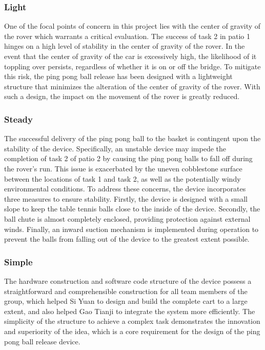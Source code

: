 \documentclass[12pt, a4paper, oneside]{report}
\begin{document}
\subsubsection{Light}
One of the focal points of concern in this project lies with the center of gravity of the rover which warrants a critical evaluation. The success of task 2 in patio 1 hinges on a high level of stability in the center of gravity of the rover. In the event that the center of gravity of the car is excessively high, the likelihood of it toppling over persists, regardless of whether it is on or off the bridge. To mitigate this risk, the ping pong ball release has been designed with a lightweight structure that minimizes the alteration of the center of gravity of the rover. With such a design, the impact on the movement of the rover is greatly reduced.

\subsubsection{Steady}
The successful delivery of the ping pong ball to the basket is contingent upon the stability of the device. Specifically, an unstable device may impede the completion of task 2 of patio 2 by causing the ping pong balls to fall off during the rover's run. This issue is exacerbated by the uneven cobblestone surface between the locations of task 1 and task 2, as well as the potentially windy environmental conditions. To address these concerns, the device incorporates three measures to ensure stability. Firstly, the device is designed with a small slope to keep the table tennis balls close to the inside of the device. Secondly, the ball chute is almost completely enclosed, providing protection against external winds. Finally, an inward suction mechanism is implemented during operation to prevent the balls from falling out of the device to the greatest extent possible.

\subsubsection{Simple}
The hardware construction and software code structure of the device possess a straightforward and comprehensible construction for all team members of the group, which helped Si Yuan to design and build the complete cart to a large extent, and also helped Gao Tianji to integrate the system more efficiently. The simplicity of the structure to achieve a complex task demonstrates the innovation and superiority of the idea, which is a core requirement for the design of the ping pong ball release device.
\end{document}
